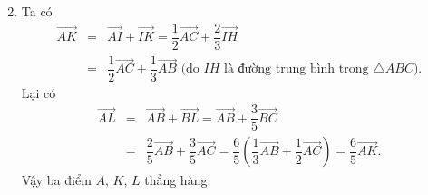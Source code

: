 \begin{bt}
{{		}
		\begin{enumerate}
			\setcounter{enumi}{1}
			\item Ta có
			\allowdisplaybreaks
			\begin{eqnarray*}
				\overrightarrow{AK}&= & \overrightarrow{AI}+\overrightarrow{IK}=\dfrac{1}{2}\overrightarrow{AC}+\dfrac{2}{3}\overrightarrow{IH}\\
				&= & \dfrac{1}{2}\overrightarrow{AC}+\dfrac{1}{3}\overrightarrow{AB} \text{ (do } IH \text{ là đường trung bình trong } \triangle ABC).
			\end{eqnarray*}
			Lại có
			\allowdisplaybreaks
			\begin{eqnarray*}
				\overrightarrow{AL}&= & \overrightarrow{AB}+\overrightarrow{BL}=\overrightarrow{AB}+\dfrac{3}{5}\overrightarrow{BC}\\
				&= & \dfrac{2}{5}\overrightarrow{AB}+\dfrac{3}{5}\overrightarrow{AC}=\dfrac{6}{5}\left(\dfrac{1}{3}\overrightarrow{AB}+\dfrac{1}{2}\overrightarrow{AC}\right)=\dfrac{6}{5}\overrightarrow{AK}.
			\end{eqnarray*}
			Vậy ba điểm $A$, $K$, $L$ thẳng hàng.
		\end{enumerate}
	}
\end{bt}

